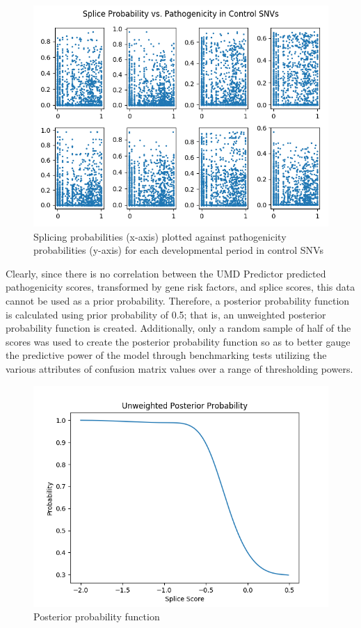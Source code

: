 \documentclass[12pt]{article}
\begin{document}
\begin{figure}[ht]
\centering
    \includegraphics[width=\textwidth,height=\textheight,keepaspectratio]{../analysis/neg_corr.png}
    \caption{Splicing probabilities (x-axis) plotted against pathogenicity probabilities (y-axis) for each developmental period in control SNVs}
\end{figure}

\pagebreak

Clearly, since there is no correlation between the UMD Predictor predicted
pathogenicity scores, transformed by gene risk factors, and splice scores,
this data cannot be used as a prior probability. Therefore, a posterior 
probability function is calculated using prior probability of 0.5; that is,
an unweighted posterior probability function is created. Additionally, only a
random sample of half of the scores was used to create the posterior probability
function so as to better gauge the predictive power of the model through
benchmarking tests utilizing the various attributes of confusion matrix values
over a range of thresholding powers.

\begin{figure}[ht]
\centering
    \includegraphics[width=\textwidth,height=\textheight,keepaspectratio]{../analysis/posterior.png}
    \caption{Posterior probability function}
\end{figure}
\end{document}
